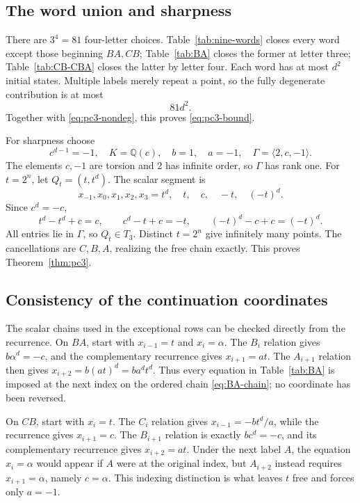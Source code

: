 \documentclass[11pt]{article}
\theoremstyle{definition}
\begin{document}
\subsection{The word union and sharpness}

There are \(3^4=81\) four-letter choices. Table~\ref{tab:nine-words} closes every word except those beginning \(BA,CB\); Table~\ref{tab:BA} closes the former at letter three; Table~\ref{tab:CB-CBA} closes the latter by letter four. Each word has at most \(d^2\) initial states. Multiple labels merely repeat a point, so the fully degenerate contribution is at most
\begin{equation}
 81d^2.
 \label{eq:pc3-degenerate}
\end{equation}
Together with \eqref{eq:pc3-nondeg}, this proves \eqref{eq:pc3-bound}.

For sharpness choose
\begin{equation}
 c^{d-1}=-1,\quad K=\mathbb Q(c),\quad b=1,\quad a=-1,\quad
 \Gamma=\langle2,c,-1\rangle.
 \label{eq:pc3-sharp-data}
\end{equation}
The elements \(c,-1\) are torsion and \(2\) has infinite order, so \(\Gamma\) has rank one. For \(t=2^n\), let \(Q_t=(t,t^d)\). The scalar segment is
\begin{equation}
 x_{-1},x_0,x_1,x_2,x_3
 =t^d,\quad t,\quad c,\quad -t,\quad(-t)^d.
 \label{eq:pc3-sharp-chain}
\end{equation}
Since \(c^d=-c\),
\[
 t^d-t^d+c=c,\qquad c^d-t+c=-t,\qquad
 (-t)^d-c+c=(-t)^d.
\]
All entries lie in \(\Gamma\), so \(Q_t\in T_3\). Distinct \(t=2^n\) give infinitely many points. The cancellations are \(C,B,A\), realizing the free chain exactly. This proves Theorem~\ref{thm:pc3}.


\subsection{Consistency of the continuation coordinates}

The scalar chains used in the exceptional rows can be checked directly from the recurrence. On \(BA\), start with \(x_{i-1}=t\) and \(x_i=\alpha\). The \(B_i\) relation gives \(b\alpha^d=-c\), and the complementary recurrence gives \(x_{i+1}=at\). The \(A_{i+1}\) relation then gives \(x_{i+2}=b(at)^d=ba^dt^d\). Thus every equation in Table~\ref{tab:BA} is imposed at the next index on the ordered chain \eqref{eq:BA-chain}; no coordinate has been reversed.

On \(CB\), start with \(x_i=t\). The \(C_i\) relation gives \(x_{i-1}=-bt^d/a\), while the recurrence gives \(x_{i+1}=c\). The \(B_{i+1}\) relation is exactly \(bc^d=-c\), and its complementary recurrence gives \(x_{i+2}=at\). Under the next label \(A\), the equation \(x_i=\alpha\) would appear if \(A\) were at the original index, but \(A_{i+2}\) instead requires \(x_{i+1}=\alpha\), namely \(c=\alpha\). This indexing distinction is what leaves \(t\) free and forces only \(a=-1\).
\end{document}

